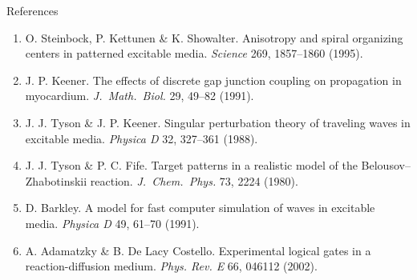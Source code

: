 \documentclass[aspectratio=169,11pt]{beamer}
\begin{document}
\begin{frame}{References}

{\footnotesize
\begin{enumerate}
    \item O. Steinbock, P. Kettunen \& K. Showalter. Anisotropy and spiral organizing centers in patterned excitable media. \textit{Science} 269, 1857--1860 (1995).
    \item J. P. Keener. The effects of discrete gap junction coupling on propagation in myocardium. \textit{J.~Math.~Biol.} 29, 49--82 (1991).
    \item J. J. Tyson \& J. P. Keener. Singular perturbation theory of traveling waves in excitable media. \textit{Physica D} 32, 327--361 (1988).
    \item J. J. Tyson \& P. C. Fife. Target patterns in a realistic model of the Belousov--Zhabotinskii reaction. \textit{J.~Chem.~Phys.} 73, 2224 (1980).
    \item D. Barkley. A model for fast computer simulation of waves in excitable media. \textit{Physica D} 49, 61--70 (1991).
    \item A. Adamatzky \& B. De Lacy Costello. Experimental logical gates in a reaction-diffusion medium. \textit{Phys. Rev. E} 66, 046112 (2002).
\end{enumerate}
}

\end{frame}
\end{document}
